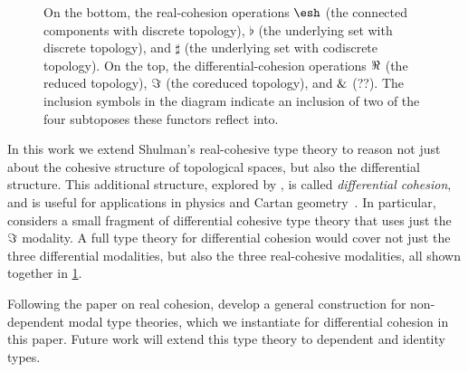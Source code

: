 \documentclass{article}
\begin{document}
\begin{figure}
\begin{center}
\end{center}
\caption{On the bottom, the real-cohesion operations $\shape$ (the connected
  components with discrete topology), $\flat$ (the underlying set with discrete topology), and $\sharp$ (the underlying set with
  codiscrete topology). On the top, the differential-cohesion operations $\Re$
  (the reduced topology), $\Im$ (the coreduced topology), and $\&$ (??).
   The inclusion symbols in the diagram indicate an
  inclusion of two of the four subtoposes these functors reflect into. }
\label{fig:modalities}
\end{figure}

In this work we extend Shulman's real-cohesive type theory to reason not just
about the cohesive structure of topological spaces, but also the differential
structure. This additional structure, explored by \citet{Schreiber2013}, is
called \emph{differential cohesion}, and is useful for applications in physics
and Cartan geometry~\citep{Wellen2017}. In particular, \citeauthor{Wellen2017}
considers a small fragment of differential cohesive type theory that uses just
the $\Im$ modality. A full type theory for differential cohesion would cover
not just the three differential modalities, but also the three real-cohesive
modalities, all shown together in \cref{fig:modalities}.

Following the \citeyear{Licata2016} paper on real cohesion, \citet{Licata2017}
develop a general construction for non-dependent modal type theories, which we
instantiate for differential cohesion in this paper. Future work will extend
this type theory to dependent and identity types.
\end{document}

